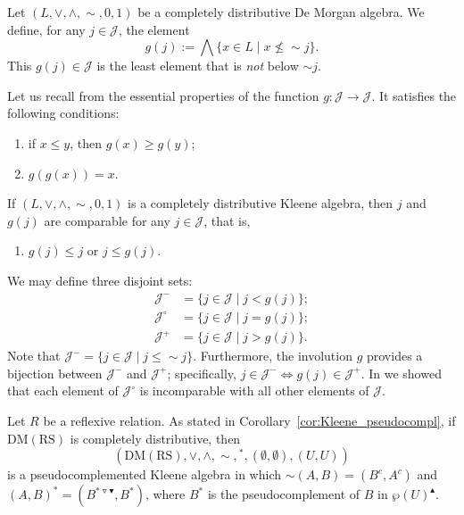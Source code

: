 \documentclass[11pt,a4paper]{amsart}
\newcommand{\UP}{\blacktriangle}
\newcommand{\DOWN}{\blacktriangledown}
\newcommand{\Down}{\triangledown}
\theoremstyle{plain}
\theoremstyle{definition}
\theoremstyle{remark}
\numberwithin{equation}{section}
\begin{document}
Let $(L,\vee,\wedge,{\sim},0,1)$ be a completely 
distributive De Morgan algebra. We define, for any 
$j \in \mathcal{J}$, the element
\begin{equation}\label{Eq:Gee}
 g(j) := \bigwedge \{x \in L \mid x\nleq {\sim} j \}.
\end{equation}
This $g(j) \in \mathcal{J}$ is the least element that is 
\emph{not} below ${\sim}j$. 

Let us recall from \cite{JarRad11, JarRad18}
the essential properties of the function 
$g \colon \mathcal{J} \to \mathcal{J}$.
It satisfies the following conditions:
\begin{enumerate}[label = ({J}\arabic*)]
 \item if $x \leq y$, then $g(x) \geq g(y)$;
 \item $g(g(x))= x$.
\end{enumerate}
If $(L,\vee,\wedge,{\sim},0,1)$ is a completely distributive 
Kleene algebra, then $j$ and $g(j)$ are comparable for any 
$j \in \mathcal{J}$, that is,
\begin{enumerate}[label = ({J}\arabic*)]
\addtocounter{enumi}{2}
 \item $g(j)\leq j \text{ or } j \leq g(j)$.
\end{enumerate}
We may define three disjoint sets:
\begin{align*}
    \mathcal{J}^- &= \{j \in \mathcal{J} \mid j < g(j) \}; \\
    \mathcal{J}^\circ &= \{j \in \mathcal{J} \mid j = g(j) \}; \\
    \mathcal{J}^+ &= \{j \in \mathcal{J} \mid j > g(j) \}.
\end{align*}
Note that 
$\mathcal{J}^{-} = \{ j \in \mathcal{J} \mid  j \leq {\sim} j\}$. Furthermore, the involution $g$ provides a bijection between 
$\mathcal{J}^-$ and $\mathcal{J}^+$; specifically,
$j\in \mathcal{J}^{-} \iff  g(j)\in \mathcal{J}^{+}$.
In \cite[Lemma 4.5]{JarRad18} we showed
that each element of $\mathcal{J}^{\circ}$ is
incomparable with all other elements of $\mathcal{J}$.
 


Let $R$ be a reflexive relation. As stated in 
Corollary~\ref{cor:Kleene_pseudocompl}, if 
$\mathrm{DM(RS)}$ is completely distributive, then
\[ 
(\mathrm{DM(RS)},\vee,\wedge,{\sim},{^*}, 
(\emptyset,\emptyset), (U,U) ) 
\]
is a pseudocomplemented Kleene algebra in which ${\sim}(A,B) = (B^c, A^c)$ 
and $(A,B)^* = (B^{* \Down \DOWN}, B^*)$, where $B^*$ is the 
pseudocomplement of $B$ in $\wp(U)^\UP$. 
\end{document}
